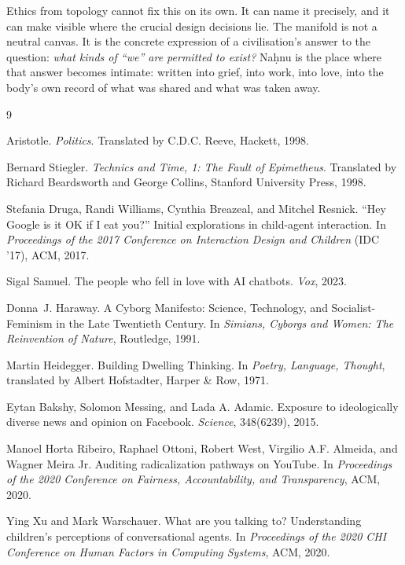 Ethics from topology cannot fix this on its own. It can name it precisely, and it can make visible where the crucial design decisions lie. The manifold is not a neutral canvas. It is the concrete expression of a civilisation's answer to the question: \emph{what kinds of ``we'' are permitted to exist?} Na\d{h}nu is the place where that answer becomes intimate: written into grief, into work, into love, into the body's own record of what was shared and what was taken away.


\begin{thebibliography}{9}

Aristotle.
\newblock \emph{Politics}.
\newblock Translated by C.D.C. Reeve, Hackett, 1998.

Bernard Stiegler.
\newblock \emph{Technics and Time, 1: The Fault of Epimetheus}.
\newblock Translated by Richard Beardsworth and George Collins, Stanford University Press, 1998.

Stefania Druga, Randi Williams, Cynthia Breazeal, and Mitchel Resnick.
\newblock ``Hey Google is it OK if I eat you?'' Initial explorations in child-agent interaction.
\newblock In \emph{Proceedings of the 2017 Conference on Interaction Design and Children} (IDC '17), ACM, 2017.

Sigal Samuel.
\newblock The people who fell in love with AI chatbots.
\newblock \emph{Vox}, 2023.

Donna~J. Haraway.
\newblock A Cyborg Manifesto: Science, Technology, and Socialist-Feminism in the Late Twentieth Century.
\newblock In \emph{Simians, Cyborgs and Women: The Reinvention of Nature}, Routledge, 1991.

Martin Heidegger.
\newblock Building Dwelling Thinking.
\newblock In \emph{Poetry, Language, Thought}, translated by Albert Hofstadter, Harper \& Row, 1971.

Eytan Bakshy, Solomon Messing, and Lada A. Adamic.
\newblock Exposure to ideologically diverse news and opinion on Facebook.
\newblock \emph{Science}, 348(6239), 2015.

Manoel Horta Ribeiro, Raphael Ottoni, Robert West, Virgilio A.F. Almeida, and Wagner Meira Jr.
\newblock Auditing radicalization pathways on YouTube.
\newblock In \emph{Proceedings of the 2020 Conference on Fairness, Accountability, and Transparency}, ACM, 2020.

Ying Xu and Mark Warschauer.
\newblock What are you talking to? Understanding children's perceptions of conversational agents.
\newblock In \emph{Proceedings of the 2020 CHI Conference on Human Factors in Computing Systems}, ACM, 2020.

\end{thebibliography}
